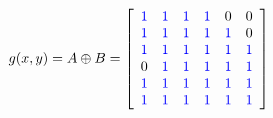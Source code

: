 \documentclass[varwidth=true]{standalone}
\begin{document}
\[
	g(x,y) = A \oplus B = \left[\begin{array}{*6{c}}
    \color{blue}{1} & \color{blue}{1} & \color{blue}{1} & \color{blue}{1} & 0 & 0 \\
    \color{blue}{1} & \color{blue}{1} & \color{blue}{1} & \color{blue}{1} & \color{blue}{1} & 0 \\
    \color{blue}{1} & \color{blue}{1} & \color{blue}{1} & \color{blue}{1} & \color{blue}{1} & \color{blue}{1} \\
    0 & \color{blue}{1} & \color{blue}{1} & \color{blue}{1} & \color{blue}{1} & \color{blue}{1} \\
    \color{blue}{1} & \color{blue}{1} & \color{blue}{1} & \color{blue}{1} & \color{blue}{1} & \color{blue}{1}  \\
    \color{blue}{1} & \color{blue}{1} & \color{blue}{1} & \color{blue}{1} & \color{blue}{1} & \color{blue}{1}
  \end{array}\right]
\]

\end{document}
